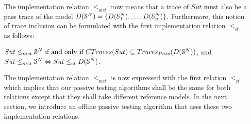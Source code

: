 The implementation relation $\leq_{mct}$ now means that a trace
of $\mathit{Sut}$ must also be a pass trace of the model
$D(\EuScript{S}^{N})=\{D(\EuScript{S}_1^{N}),\dots,D(\EuScript{S}_n^{N})\}$.
Furthermore, this notion of trace inclusion can be formulated
with the first implementation relation $\leq_{ct}$ as follows:

\begin{proposition}
    ${Sut} \leq_{mct} \EuScript{S}^{N} \text{ if and only if }
    CTraces({Sut})\subseteq
    Traces_{Pass}(D(\EuScript{S}^{N}))$, and ${Sut} \leq_{mct}
    \EuScript{S}^{N} \Leftrightarrow {Sut} \leq_{ct}
    D(\EuScript{S}^{N})$.

    \label{rel:impl2}
\end{proposition}

The implementation relation $\leq_{mct}$ is now expressed with
the first relation $\leq_{ct}$, which implies that our passive
testing algorithms shall be the same for both relations except
that they shall take different reference models. In the next
section, we introduce an offline passive testing algorithm that
uses these two implementation relations.
